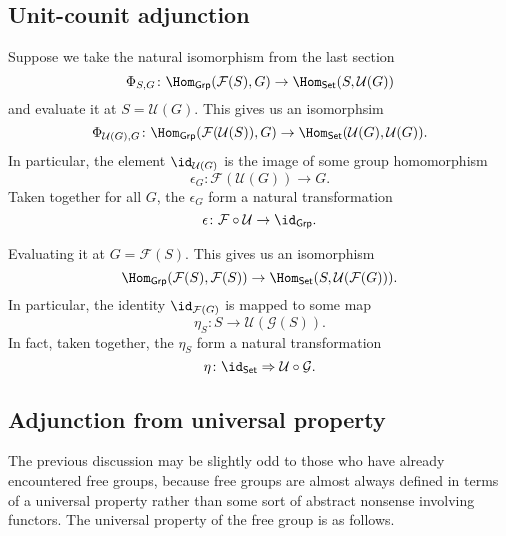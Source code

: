 \documentclass[main.tex]{subfiles}
\begin{document}
\subsection{Unit-counit adjunction}
\label{ssc:unit_counit_adjunction}

Suppose we take the natural isomorphism from the last section
\begin{equation*}
  \Phi_{S, G}\colon \Hom_{\mathsf{Grp}}(\mathcal{F}(S), G) \to \Hom_{\mathsf{Set}}(S, \mathcal{U}(G))
\end{equation*}
and evaluate it at $S = \mathcal{U}(G)$. This gives us an isomorphsim
\begin{equation*}
  \Phi_{\mathcal{U}(G), G}\colon \Hom_{\mathsf{Grp}}(\mathcal{F}(\mathcal{U}(S)), G) \to \Hom_{\mathsf{Set}}(\mathcal{U}(G), \mathcal{U}(G)).
\end{equation*}
In particular, the element $\id_{\mathcal{U}(G)}$ is the image of some group homomorphism
\begin{equation*}
  \epsilon_{G}\colon \mathcal{F}(\mathcal{U}(G)) \to G.
\end{equation*}
Taken together for all $G$, the $\epsilon_{G}$ form a natural transformation
\begin{equation*}
  \epsilon\colon \mathcal{F} \circ \mathcal{U} \to \id_{\mathsf{Grp}}.
\end{equation*}

Evaluating it at $G = \mathcal{F}(S)$. This gives us an isomorphism
\begin{equation*}
  \Hom_{\mathsf{Grp}}(\mathcal{F}(S), \mathcal{F}(S)) \to \Hom_{\mathsf{Set}}(S, \mathcal{U}(\mathcal{F}(G))).
\end{equation*}
In particular, the identity $\id_{\mathcal{F}(G)}$ is mapped to some map
\begin{equation*}
  \eta_{S}\colon S \to \mathcal{U}(\mathcal{G}(S)).
\end{equation*}
In fact, taken together, the $\eta_{S}$ form a natural transformation
\begin{equation*}
  \eta\colon \id_{\mathsf{Set}} \Rightarrow \mathcal{U} \circ \mathcal{G}.
\end{equation*}

\subsection{Adjunction from universal property}
\label{ssc:adjunction_from_universal_property}

The previous discussion may be slightly odd to those who have already encountered free groups, because free groups are almost always defined in terms of a universal property rather than some sort of abstract nonsense involving functors. The universal property of the free group is as follows.
\end{document}
